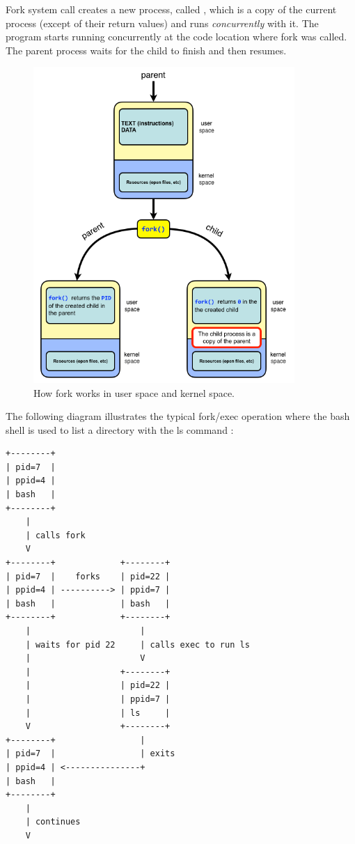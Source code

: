 \documentclass[a4paper]{article}
\begin{document}
Fork system call creates a new process, called , which is a copy of the current process (except of their return values) and runs \textit{concurrently} with it.  The program starts running concurrently at the code location where fork was called. The parent process waits for the child to finish and then resumes.
\begin{figure}[H]
    \centering
    \includegraphics[height=12cm]{img/fork_details.png}
    \caption{How fork works in user space and kernel space.}
\end{figure}

The following diagram illustrates the typical fork/exec operation where the bash shell is used to list a directory with the ls command \cite{stflowforkexec}:
\newpage
\begin{verbatim}
+--------+
| pid=7  |
| ppid=4 |
| bash   |
+--------+
    |
    | calls fork
    V
+--------+             +--------+
| pid=7  |    forks    | pid=22 |
| ppid=4 | ----------> | ppid=7 |
| bash   |             | bash   |
+--------+             +--------+
    |                      |
    | waits for pid 22     | calls exec to run ls
    |                      V
    |                  +--------+
    |                  | pid=22 |
    |                  | ppid=7 |
    |                  | ls     |
    V                  +--------+
+--------+                 |
| pid=7  |                 | exits
| ppid=4 | <---------------+
| bash   |
+--------+
    |
    | continues
    V
\end{verbatim}
\end{document}
